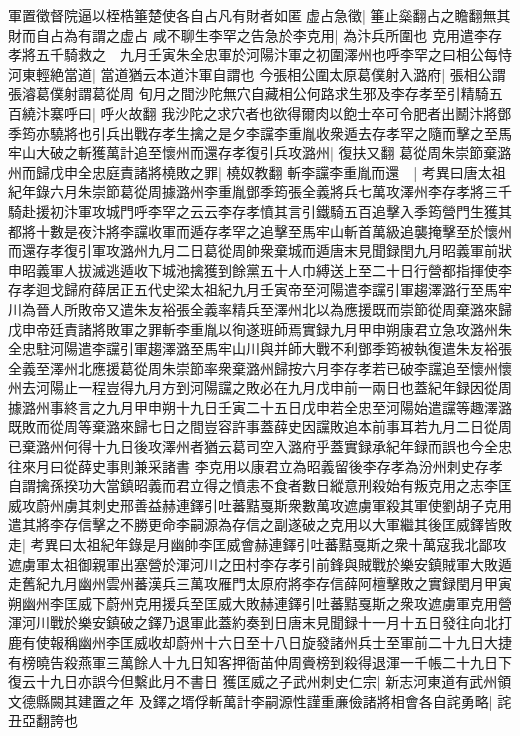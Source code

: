 軍置徵督院逼以桎梏箠楚使各自占凡有財者如匿虚占急徵|{
	箠止橤翻占之瞻翻無其財而自占為有謂之虚占}
咸不聊生李罕之告急於李克用|{
	為汴兵所圍也}
克用遣李存孝將五千騎救之　九月壬寅朱全忠軍於河陽汴軍之初圍澤州也呼李罕之曰相公每恃河東輕絶當道|{
	當道猶云本道汴軍自謂也}
今張相公圍太原葛僕射入潞府|{
	張相公謂張濬葛僕射謂葛從周}
旬月之間沙陀無穴自藏相公何路求生邪及李存孝至引精騎五百繞汴寨呼曰|{
	呼火故翻}
我沙陀之求穴者也欲得爾肉以飽士卒可令肥者出鬭汴將鄧季筠亦驍將也引兵出戰存孝生擒之是夕李讜李重胤收衆遁去存孝罕之隨而擊之至馬牢山大破之斬獲萬計追至懷州而還存孝復引兵攻潞州|{
	復扶又翻}
葛從周朱崇節棄潞州而歸戊申全忠庭責諸將橈敗之罪|{
	橈奴教翻}
斬李讜李重胤而還　|{
	考異曰唐太祖紀年錄六月朱崇節葛從周據潞州李重胤鄧季筠張全義將兵七萬攻澤州李存孝將三千騎赴援初汴軍攻城門呼李罕之云云李存孝憤其言引鐵騎五百追擊入季筠營門生獲其都將十數是夜汴將李讜收軍而遁存孝罕之追擊至馬牢山斬首萬級追襲掩擊至於懷州而還存孝復引軍攻潞州九月二日葛從周帥衆棄城而遁唐末見聞録閏九月昭義軍前狀申昭義軍人拔滅逃遁收下城池擒獲到餘黨五十人巾縛送上至二十日行營都指揮使李存孝迴戈歸府薛居正五代史梁太祖紀九月壬寅帝至河陽遣李讜引軍趨澤潞行至馬牢川為晉人所敗帝又遣朱友裕張全義率精兵至澤州北以為應援既而崇節從周棄潞來歸戊申帝廷責諸將敗軍之罪斬李重胤以徇遂班師焉實録九月甲申朔康君立急攻潞州朱全忠駐河陽遣李讜引軍趨澤潞至馬牢山川與并師大戰不利鄧季筠被執復遣朱友裕張全義至澤州北應援葛從周朱崇節率衆棄潞州歸按六月李存孝若已破李讜追至懷州懷州去河陽止一程豈得九月方到河陽讜之敗必在九月戊申前一兩日也蓋紀年録因從周據潞州事終言之九月甲申朔十九日壬寅二十五日戊申若全忠至河陽始遣讜等趣澤潞既敗而從周等棄潞來歸七日之間豈容許事蓋薛史因讜敗追本前事耳若九月二日從周已棄潞州何得十九日後攻澤州者猶云葛司空入潞府乎蓋實録承紀年録而誤也今全忠往來月曰從薛史事則兼采諸書}
李克用以康君立為昭義留後李存孝為汾州刺史存孝自謂擒孫揆功大當鎮昭義而君立得之憤恚不食者數日縱意刑殺始有叛克用之志李匡威攻蔚州虜其刺史邢善益赫連鐸引吐蕃黠戛斯衆數萬攻遮虜軍殺其軍使劉胡子克用遣其將李存信擊之不勝更命李嗣源為存信之副遂破之克用以大軍繼其後匡威鐸皆敗走|{
	考異曰太祖紀年錄是月幽帥李匡威會赫連鐸引吐蕃黠戛斯之衆十萬寇我北鄙攻遮虜軍太祖御親軍出塞營於渾河川之田村李存孝引前鋒與賊戰於樂安鎮賊軍大敗遁走舊紀九月幽州雲州蕃漢兵三萬攻雁門太原府將李存信薛阿檀擊敗之實録閏月甲寅朔幽州李匡威下蔚州克用援兵至匡威大敗赫連鐸引吐蕃黠戛斯之衆攻遮虜軍克用營渾河川戰於樂安鎮破之鐸乃退軍此蓋約奏到日唐末見聞録十一月十五日發往向北打鹿有使報稱幽州李匡威收却蔚州十六日至十八日旋發諸州兵士至軍前二十九日大捷有榜曉告殺燕軍三萬餘人十九日知客押衙苖仲周賫榜到殺得退渾一千帳二十九日下復云十九日亦誤今但繫此月不書日}
獲匡威之子武州刺史仁宗|{
	新志河東道有武州領文德縣闕其建置之年}
及鐸之壻俘斬萬計李嗣源性謹重亷儉諸將相會各自詫勇略|{
	詫丑亞翻誇也}
